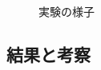 \begin{figure}[htbp]
  \begin{minipage}{\hsize}
    \begin{center}
    \end{center}
    \caption{実験の様子}
    \label{fig:observe}
  \end{minipage}
\end{figure}

\subsection{結果と考察}